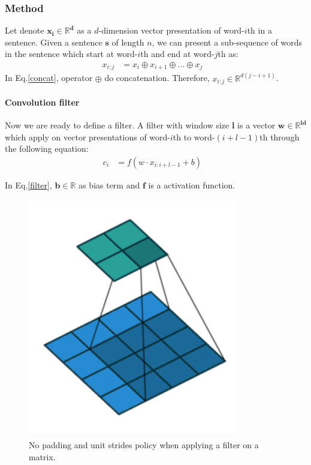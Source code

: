 \subsubsection{Method}
Let denote \(\bm{x_i \in \mathbb{R}^d}\) as a \(d\)-dimension vector presentation of word-\(i\)th in a sentence. 
Given a sentence \(\bm{s}\) of length \(n\), we can present a sub-sequence of words in the sentence which start at word-\(i\)th and end at word-\(j\)th as:
\begin{align}
	x_{i:j} &= x_i \oplus x_{i+1} \oplus ... \oplus x_{j} &\label{concat}
\end{align}
In Eq.\eqref{concat}, operator \(\bm{\oplus}\) do concatenation. Therefore, \(x_{i:j} \in \mathbb{R}^{d(j-i+1)}\). 

\paragraph{Convolution filter} \label{conv-filter} Now we are ready to define a filter. A filter with window size \(\bm{l}\) is a vector \(\bm{w \in \mathbb{R}^{ld}}\) which apply on vector presentations of word-\(i\)th to word-\((i+l-1)\)th through the following equation:
\begin{align}
	c_i &= f(w \cdot x_{i:i+l-1} + b) &\label{filter}
\end{align}

In Eq.\eqref{filter}, \(\bm{b \in \mathbb{R}}\) as bias term and \(\bm{f}\) is a activation function. 

\begin{figure}[H]
	\centering
	\includegraphics[scale=0.4]{figure/no_padding}
	\caption{No padding and unit strides policy when applying a filter on a matrix.}
	\label{fig:no_padding}
\end{figure}

